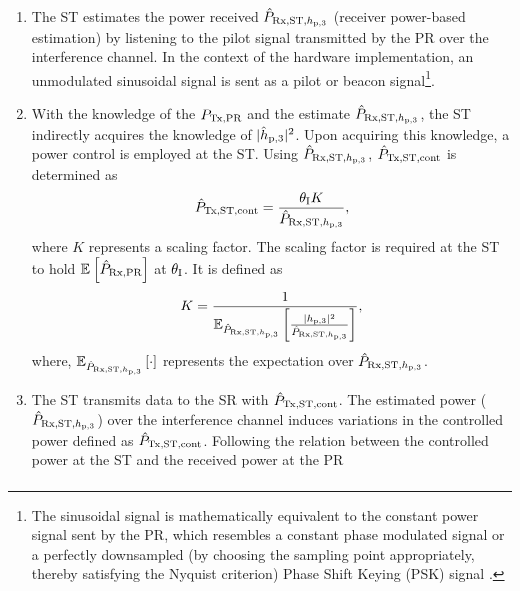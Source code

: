 \begin{enumerate}
	\item The ST estimates the power received $\hat{P}_{\text{Rx,ST,$h_{\text{p,3}}$}}$ (receiver power-based estimation) by listening to the pilot signal transmitted by the PR over the interference channel. In the context of the hardware implementation, an unmodulated sinusoidal signal is sent as a pilot or beacon signal\footnote{The sinusoidal signal is mathematically equivalent to the constant power signal sent by the PR, which resembles a constant phase modulated signal or a perfectly downsampled (by choosing the sampling point appropriately, thereby satisfying the Nyquist criterion) Phase Shift Keying (PSK) signal .}.
	\item With the knowledge of the $P_{\text{Tx,PR}}$ and the estimate $\hat{P}_{\text{Rx,ST,$h_{\text{p,3}}$}}$, the ST indirectly acquires the knowledge of $|\hat{h}_{\text{p,3}}|^2$. 
	Upon acquiring this knowledge, a power control is employed at the ST. Using $\hat{P}_{\text{Rx,ST,$h_{\text{p,3}}$}}$, $\hat{P}_{\text{Tx,ST,cont}}$ is determined as 
\begin{align}
\hat{P}_{\text{Tx,ST,cont}} = \frac{\theta_{\text{I}} K}{\hat{P}_{\text{Rx,ST,$h_{\text{p,3}}$}}}, \label{eq_HVD:preg} 
\end{align}
where $K$ represents a scaling factor. The scaling factor is required at the ST to hold ${\mathbb E}_{}\left[ \hat{P}_{\text{Rx,PR}} \right]$ at $\theta_{\text{I}}$. It is defined as
\begin{align}
K = \frac{1}{ {\mathbb E}_{\hat{P}_{\text{Rx,ST,$h_{\text{p,3}}$}}}\left[ \frac{|h_{\text{p,3}}|^2}{\hat{P}_{\text{Rx,ST,$h_{\text{p,3}}$}}} \right]}, \label{eq_HVD:sca} 
\end{align}
where, ${\mathbb E}_{\hat{P}_{\text{Rx,ST,$h_{\text{p,3}}$}}}\left[ \cdot \right]$ represents the expectation over $\hat{P}_{\text{Rx,ST,$h_{\text{p,3}}$}}$.
	\item The ST transmits data to the SR with $\hat{P}_{\text{Tx,ST,cont}}$. 
	The estimated power ($\hat{P}_{\text{Rx,ST,$h_{\text{p,3}}$}}$) over the interference channel induces variations in the controlled power defined as $\hat{P}_{\text{Tx,ST,cont}}$. Following the relation between the controlled power at the ST and the received power at the PR 
\begin{align}

\end{align}
\end{enumerate}

